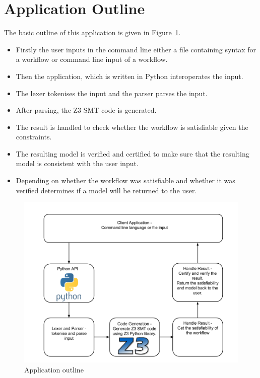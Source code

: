 \documentclass[a4paper]{report}
\begin{document}
\section{Application Outline}
The basic outline of this application is given in Figure~\ref{fig:Application outline}.
\begin{itemize}
\item Firstly the user inputs in the command line either a file containing syntax for a workflow or command line input of a workflow.
\item Then the application, which is written in Python interoperates the input.
\item The lexer tokenises the input and the parser parses the input.
\item After parsing, the Z3 SMT code is generated.
\item The result is handled to check whether the workflow is satisfiable given the constraints.
\item The resulting model is verified and certified to make sure that the resulting model is consistent with the user input.
\item Depending on whether the workflow was satisfiable and whether it was verified determines if a model will be returned to the user.
\end{itemize}

\begin{figure}[!h]
\centering
\includegraphics[scale=0.5]{ApplicationDiagram.png}
\caption{Application outline}
\label{fig:Application outline}
\end{figure}
\end{document}
